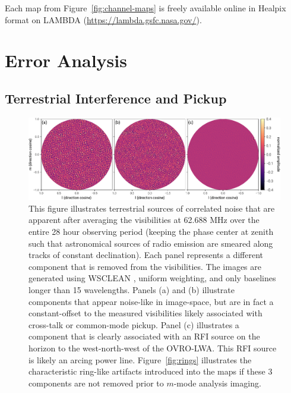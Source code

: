 \documentclass[twocolumn]{aastex61}
\begin{document}
Each map from Figure~\ref{fig:channel-maps} is freely available online in Healpix format
\citep{2005ApJ...622..759G} on LAMBDA (\url{https://lambda.gsfc.nasa.gov/}).

\section{Error Analysis}\label{sec:error}

\subsection{Terrestrial Interference and Pickup}\label{sec:rfi}

\begin{figure}[t]
    \includegraphics[width=\textwidth]{figures/terrestrial-interference/smeared}
    \caption{
        This figure illustrates terrestrial sources of correlated noise that are apparent after
        averaging the visibilities at 62.688 MHz over the entire 28 hour observing period (keeping
        the phase center at zenith such that astronomical sources of radio emission are smeared
        along tracks of constant declination). Each panel represents a different component that is
        removed from the visibilities. The images are generated using WSCLEAN
        \citep{2014MNRAS.444..606O}, uniform weighting, and only baselines longer than 15
        wavelengths. Panels (a) and (b) illustrate components that appear noise-like in image-space,
        but are in fact a constant-offset to the measured visibilities likely associated with
        cross-talk or common-mode pickup. Panel (c) illustrates a component that is clearly
        associated with an RFI source on the horizon to the west-north-west of the OVRO-LWA. This
        RFI source is likely an arcing power line.  Figure~\ref{fig:rings} illustrates the
        characteristic ring-like artifacts introduced into the maps if these 3 components are not
        removed prior to $m$-mode analysis imaging.
    }
    \label{fig:fitrfi}
\end{figure}
\end{document}
